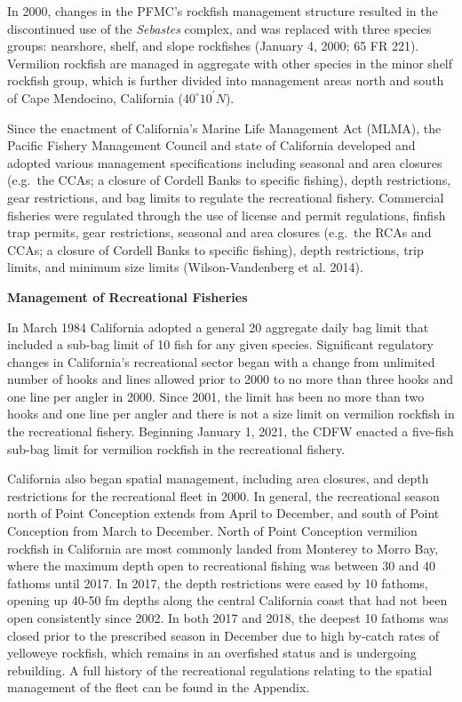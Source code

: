 \documentclass[11pt,
  english,
]{article}
\begin{document}
In 2000, changes in the PFMC's rockfish management structure resulted in the discontinued use of the \emph{Sebastes} complex, and was replaced with three species groups: nearshore, shelf, and slope rockfishes (January 4, 2000; 65 FR 221). Vermilion rockfish are managed in aggregate with other species in the minor shelf rockfish group, which is further divided into management areas north and south of Cape Mendocino, California ($40^\circ 10^\prime N$).

Since the enactment of California's Marine Life Management Act (MLMA), the Pacific Fishery Management Council and state of California developed and adopted various management specifications including seasonal and area closures (e.g.~the CCAs; a closure of Cordell Banks to specific fishing), depth restrictions, gear restrictions, and bag limits to regulate the recreational fishery. Commercial fisheries were regulated through the use of license and permit regulations, finfish trap permits, gear restrictions, seasonal and area closures (e.g.~the RCAs and CCAs; a closure of Cordell Banks to specific fishing), depth restrictions, trip limits, and minimum size limits {(Wilson-Vandenberg et al. 2014)\leavevmode\tagmcend\tagstructend}.

\textbf{Management of Recreational Fisheries}

In March 1984 California adopted a general 20 aggregate daily bag limit that included a sub-bag limit of 10 fish for any given species. Significant regulatory changes in California's recreational sector began with a change from unlimited number of hooks and lines allowed prior to 2000 to no more than three hooks and one line per angler in 2000. Since 2001, the limit has been no more than two hooks and one line per angler and there is not a size limit on vermilion rockfish in the recreational fishery. Beginning January 1, 2021, the CDFW enacted a five-fish sub-bag limit for vermilion rockfish in the recreational fishery.

California also began spatial management, including area closures, and depth restrictions for the recreational fleet in 2000. In general, the recreational season north of Point Conception extends from April to December, and south of Point Conception from March to December. North of Point Conception vermilion rockfish in California are most commonly landed from Monterey to Morro Bay, where the maximum depth open to recreational fishing was between 30 and 40 fathoms until 2017. In 2017, the depth restrictions were eased by 10 fathoms, opening up 40-50 fm depths along the central California coast that had not been open consistently since 2002. In both 2017 and 2018, the deepest 10 fathoms was closed prior to the prescribed season in December due to high by-catch rates of yelloweye rockfish, which remains in an overfished status and is undergoing rebuilding. A full history of the recreational regulations relating to the spatial management of the fleet can be found in the Appendix.
\end{document}
